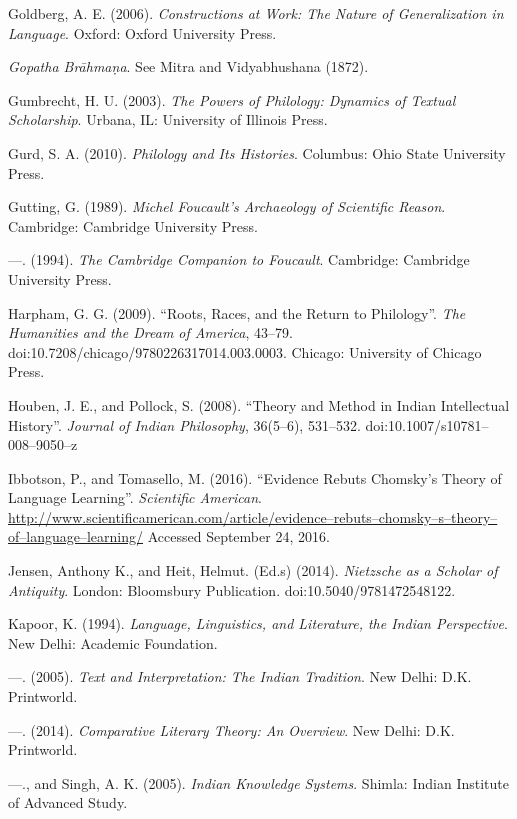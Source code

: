 \begin{thebibliography}{99}
  Goldberg, A. E. (2006). \textit{Constructions at Work: The Nature of Generalization in Language}. Oxford: Oxford University Press.

  \textit{Gopatha Brāhmaṇa}. See Mitra and Vidyabhushana (1872).

  Gumbrecht, H. U. (2003). \textit{The Powers of Philology: Dynamics of Textual Scholarship}. Urbana, IL: University of Illinois Press.

  Gurd, S. A. (2010). \textit{Philology and Its Histories}. Columbus: Ohio State University Press.

  Gutting, G. (1989). \textit{Michel Foucault's Archaeology of Scientific Reason}. Cambridge: Cambridge University Press.

  —. (1994). \textit{The Cambridge Companion to Foucault}. Cambridge: Cambridge University Press.

  Harpham, G. G. (2009). “Roots, Races, and the Return to Philology”. \textit{The Humanities and the Dream of America}, 43–79. doi:10.7208/chicago/9780226317014.003.0003. Chicago: University of Chicago Press.

  Houben, J. E., and Pollock, S. (2008). “Theory and Method in Indian Intellectual History”. \textit{Journal of Indian Philosophy}, 36(5–6), 531–532. doi:10.1007/s10781–008–9050–z

  Ibbotson, P., and Tomasello, M. (2016). “Evidence Rebuts Chomsky's Theory of Language Learning”. \textit{Scientific American}. \url{http://www.scientificamerican.com/article/evidence–rebuts–chomsky–s–theory–of–language–learning/} Accessed September 24, 2016.

  Jensen, Anthony K., and Heit, Helmut. (Ed.s) (2014). \textit{Nietzsche as a Scholar of Antiquity}. London: Bloomsbury Publication. doi:10.5040/9781472548122.

  Kapoor, K. (1994). \textit{Language, Linguistics, and Literature, the Indian Perspective}. New Delhi: Academic Foundation.

  —. (2005). \textit{Text and Interpretation: The Indian Tradition}. New Delhi: D.K. Printworld.

  —. (2014). \textit{Comparative Literary Theory: An Overview}. New Delhi: D.K. Printworld.

  —., and Singh, A. K. (2005). \textit{Indian Knowledge Systems}. Shimla: Indian Institute of Advanced Study.


\end{thebibliography}
